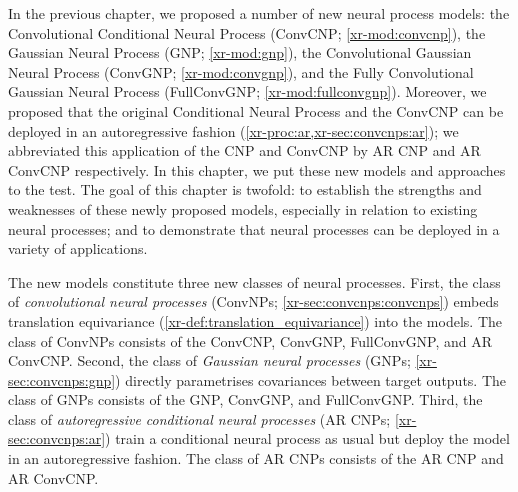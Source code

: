 \documentclass[12pt, twoside]{report}
\newcommand{\xrprefix}[1]{xr-#1}
\begin{document}
In the previous chapter, we proposed a number of new neural process models:
the Convolutional Conditional Neural Process (ConvCNP; \cref{\xrprefix{mod:convcnp}}),
the Gaussian Neural Process (GNP; \cref{\xrprefix{mod:gnp}}),
the Convolutional Gaussian Neural Process (ConvGNP; \cref{\xrprefix{mod:convgnp}}),
and the Fully Convolutional Gaussian Neural Process (FullConvGNP; \cref{\xrprefix{mod:fullconvgnp}}).
Moreover, we proposed that the original Conditional Neural Process \parencite[CNP;][]{Garnelo:2018:Conditional_Neural_Processes} and the ConvCNP can be deployed in an autoregressive fashion (\cref{\xrprefix{proc:ar},\xrprefix{sec:convcnps:ar}});
we abbreviated this application of the CNP and ConvCNP by AR CNP and AR ConvCNP respectively.
In this chapter, we put these new models and approaches to the test.
The goal of this chapter is twofold:
to establish the strengths and weaknesses of these newly proposed models, especially in relation to existing neural processes;
and to demonstrate that neural processes can be deployed in a variety of applications.

The new models constitute three new classes of neural processes.
First, the class of \emph{convolutional neural processes} (ConvNPs; \cref{\xrprefix{sec:convcnps:convcnps}}) embeds translation equivariance (\cref{\xrprefix{def:translation_equivariance}}) into the models.
The class of ConvNPs consists of the ConvCNP, ConvGNP, FullConvGNP, and AR ConvCNP.
Second, the class of \emph{Gaussian neural processes} (GNPs; \cref{\xrprefix{sec:convcnps:gnp}}) directly parametrises covariances between target outputs.
The class of GNPs consists of the GNP, ConvGNP, and FullConvGNP.
Third, the class of \emph{autoregressive conditional neural processes} (AR CNPs; \cref{\xrprefix{sec:convcnps:ar}}) train a conditional neural process as usual but deploy the model in an autoregressive fashion.
The class of AR CNPs consists of the AR CNP and AR ConvCNP.
\end{document}
